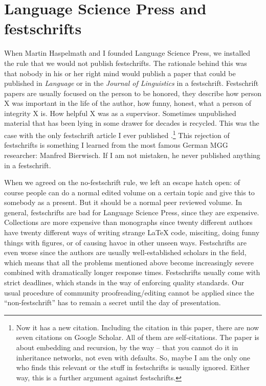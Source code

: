 \documentclass[output=paper,colorlinks,citecolor=brown]{langscibook}
\begin{document}
\section{Language Science Press and festschrifts}

When Martin Haspelmath and I founded Language Science Press, we installed the rule that we would
not publish festschrifts. The rationale behind this was that nobody in his or her right mind would
publish a paper that could be published in \emph{Language} or in the \emph{Journal of Linguistics} in a
festschrift. Festschrift papers are usually focused on the person to be honored, they describe how
person X was important in the life of the author, how funny, honest, what a person of integrity X is. How helpful X was
as a supervisor. Sometimes
unpublished material that has been lying in some drawer for decades is recycled. This was the case
with the only festschrift article I ever published \citep{MuellerDefaults}.\footnote{
  Now it has a new citation. Including the citation in this paper, there are now seven citations on
  Google Scholar. All of them are self-citations. The paper is about embedding and recursion, by the way -- that you
  cannot do it in inheritance networks, not even with defaults. So, maybe I am the only one who
  finds this relevant or the stuff in festschrifts is usually ignored. Either way, this is a further
  argument against festschrifts.
}
This rejection of festschrifts is something I learned from the most famous German MGG researcher:
Manfred Bierwisch. If I am not mistaken, he never published anything in a festschrift.

When we agreed on the no-festschrift rule, we left an escape hatch open: of course people can do a
normal edited volume on a certain topic and give this to somebody as a present. But it should be a
normal peer reviewed volume. In general, festschrifts are bad for Language Science Press, since they are
expensive. Collections are more expensive than monographs since twenty different authors have twenty
different ways of writing strange \LaTeX{} code, misciting, doing funny things with figures, or of causing havoc
in other unseen ways. Festschrifts are even worse since the authors are usually well-established scholars
in the field, which means that all the problems mentioned above become increasingly severe combined with
dramatically longer response times. Festschrifts usually come with strict deadlines, which stands in the
way of enforcing quality standards. Our usual procedure of community proofreading/editing cannot be
applied since the ``non-festschrift'' has to remain a secret until the day of presentation. 
\end{document}
